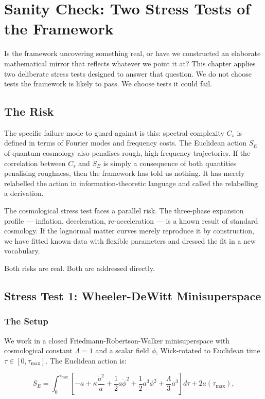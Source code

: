 \chapter{Sanity Check: Two Stress Tests of the Framework}

Is the framework uncovering something real, or have we constructed an
elaborate mathematical mirror that reflects whatever we point it at?
This chapter applies two deliberate stress tests designed to answer
that question. We do not choose tests the framework is likely to pass.
We choose tests it could fail.

\section{The Risk}

The specific failure mode to guard against is this: spectral complexity
$C_s$ is defined in terms of Fourier modes and frequency costs. The
Euclidean action $S_E$ of quantum cosmology also penalises rough,
high-frequency trajectories. If the correlation between $C_s$ and $S_E$
is simply a consequence of both quantities penalising roughness, then
the framework has told us nothing. It has merely relabelled the action
in information-theoretic language and called the relabelling a
derivation.

The cosmological stress test faces a parallel risk. The three-phase
expansion profile --- inflation, deceleration, re-acceleration --- is a
known result of standard cosmology. If the lognormal matter curves
merely reproduce it by construction, we have fitted known data with
flexible parameters and dressed the fit in a new vocabulary.

Both risks are real. Both are addressed directly.

\section{Stress Test 1: Wheeler-DeWitt Minisuperspace}

\subsection{The Setup}

We work in a closed Friedmann-Robertson-Walker minisuperspace with
cosmological constant $\Lambda = 1$ and a scalar field $\phi$,
Wick-rotated to Euclidean time $\tau \in [0, \tau_{\max}]$. The
Euclidean action is:

\[
S_E = \int_0^{\tau_{\max}} \left[ -a + \kappa \frac{\dot{a}^2}{a}
+ \frac{1}{2} a \dot{\phi}^2 + \frac{1}{2} a^3 \phi^2
+ \frac{\Lambda}{3} a^3 \right] d\tau + 2a(\tau_{\max}),
\]


